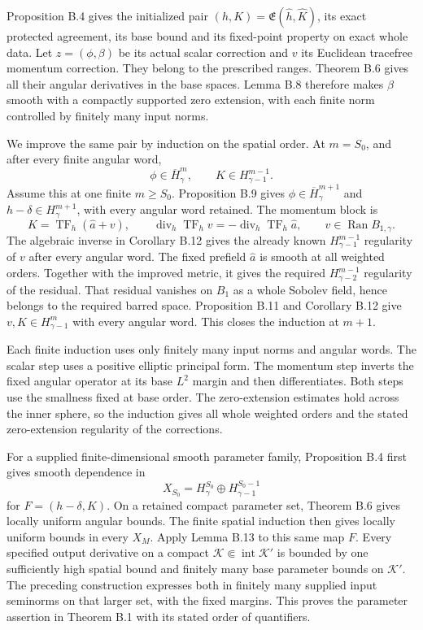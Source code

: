 \documentclass[
  english,
  11pt,
  reqno]{amsart}
\begin{document}
Proposition B.4 gives the initialized pair
\((h,K)=\mathfrak E(\widehat h,\widehat K)\), its exact protected
agreement, its base bound and its fixed-point property on exact whole
data. Let \(z=(\phi,\beta)\) be its actual scalar correction and \(v\)
its Euclidean tracefree momentum correction. They belong to the
prescribed ranges. Theorem B.6 gives all their angular derivatives in
the base spaces. Lemma B.8 therefore makes \(\beta\) smooth with a
compactly supported zero extension, with each finite norm controlled by
finitely many input norms.

We improve the same pair by induction on the spatial order. At
\(m=S_0\), and after every finite angular word, \[
\phi\in\overline H^{m}_\gamma,
\qquad K\in H^{m-1}_{\gamma-1}.
\] Assume this at one finite \(m\ge S_0\). Proposition B.9 gives
\(\phi\in\overline H^{m+1}_\gamma\) and \(h-\delta\in H^{m+1}_\gamma\),
with every angular word retained. The momentum block is \[
K=\operatorname{TF}_h(\widehat a+v),
\qquad
\operatorname{div}_h\operatorname{TF}_h v
=-\operatorname{div}_h\operatorname{TF}_h\widehat a,
\qquad v\in\operatorname{Ran}B_{1,\gamma}.
\] The algebraic inverse in Corollary B.12 gives the already known
\(H^{m-1}_{\gamma-1}\) regularity of \(v\) after every angular word. The
fixed prefield \(\widehat a\) is smooth at all weighted orders. Together
with the improved metric, it gives the required \(H^{m-1}_{\gamma-2}\)
regularity of the residual. That residual vanishes on \(B_1\) as a whole
Sobolev field, hence belongs to the required barred space. Proposition
B.11 and Corollary B.12 give \(v,K\in H^m_{\gamma-1}\) with every
angular word. This closes the induction at \(m+1\).

Each finite induction uses only finitely many input norms and angular
words. The scalar step uses a positive elliptic principal form. The
momentum step inverts the fixed angular operator at its base \(L^2\)
margin and then differentiates. Both steps use the smallness fixed at
base order. The zero-extension estimates hold across the inner sphere,
so the induction gives all whole weighted orders and the stated
zero-extension regularity of the corrections.

For a supplied finite-dimensional smooth parameter family, Proposition
B.4 first gives smooth dependence in \[
X_{S_0}=H^{S_0}_\gamma\oplus H^{S_0-1}_{\gamma-1}
\] for \(F=(h-\delta,K)\). On a retained compact parameter set, Theorem
B.6 gives locally uniform angular bounds. The finite spatial induction
then gives locally uniform bounds in every \(X_M\). Apply Lemma B.13 to
this same map \(F\). Every specified output derivative on a compact
\(\mathcal K\Subset\operatorname{int}\mathcal K'\) is bounded by one
sufficiently high spatial bound and finitely many base parameter bounds
on \(\mathcal K'\). The preceding construction expresses both in
finitely many supplied input seminorms on that larger set, with the
fixed margins. This proves the parameter assertion in Theorem B.1 with
its stated order of quantifiers.
\end{document}
